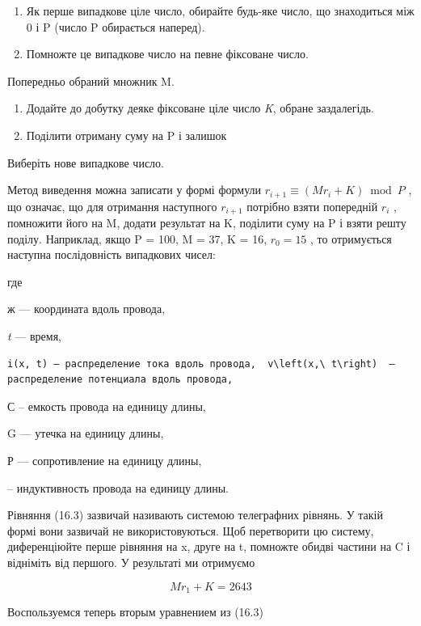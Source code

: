 \documentclass[
  ukrainian,
]{article}
\begin{document}
\begin{enumerate}
\def\labelenumi{\arabic{enumi}.}
\item
  Як перше випадкове ціле число, обирайте будь-яке число, що знаходиться
  між 0 і P (число P обирається наперед).
\item
  Помножте це випадкове число на певне фіксоване число.
\end{enumerate}

Попередньо обраний множник M.

\begin{enumerate}
\def\labelenumi{\arabic{enumi}.}
\setcounter{enumi}{2}
\item
  Додайте до добутку деяке фіксоване ціле число \emph{K}, обране
  заздалегідь.
\item
  Поділити отриману суму на P і залишок
\end{enumerate}

Виберіть нове випадкове число.

Метод виведення можна записати у формі формули
\(r_{i+1} \equiv (Mr_i + K) \bmod P\) , що означає, що для отримання
наступного \(r_{i+1}\) потрібно взяти попередній \(r_i\) , помножити
його на M, додати результат на K, поділити суму на P і взяти решту
поділу. Наприклад, якщо P = 100, M = 37, K = 16, \(r_0 = 15\) , то
отримується наступна послідовність випадкових чисел:

где

ж --- координата вдоль провода,

\emph{t} --- время,

\begin{verbatim}
i(x, t) — распределение тока вдоль провода,  v\left(x,\ t\right)  — распределение потенциала вдоль провода,
\end{verbatim}

С -- емкость провода на единицу длины,

G --- утечка на единицу длины,

Р --- сопротивление на единицу длины,

-- индуктивность провода на единицу длины.

Рівняння (16.3) зазвичай називають системою телеграфних рівнянь. У такій
формі вони зазвичай не використовуються. Щоб перетворити цю систему,
диференціюйте перше рівняння на x, друге на t, помножте обидві частини
на C і відніміть від першого. У результаті ми отримуємо

\[
Mr_1 + K = 2643
\]

Воспользуемся теперь вторым уравнением из (16.3)
\end{document}
